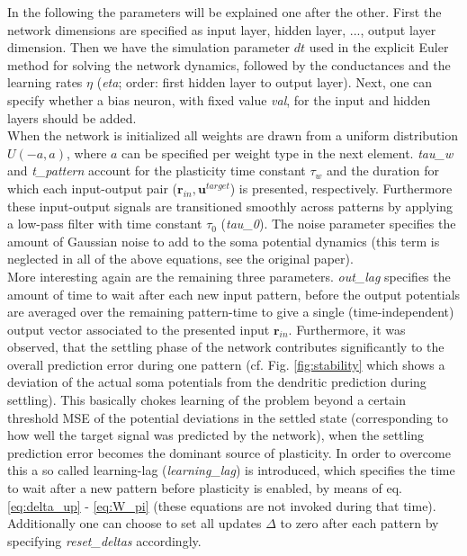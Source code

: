 \documentclass[12pt,a4paper]{article}
\begin{document}
In the following the parameters will be explained one after the other. First the network dimensions are specified as input layer, hidden layer, ..., output layer dimension. Then we have the simulation parameter $dt$ used in the explicit Euler method for solving the network dynamics, followed by the conductances and the learning rates $\eta$ (\textit{eta}; order: first hidden layer to output layer). Next, one can specify whether a bias neuron, with fixed value \textit{val}, for the input and hidden layers should be added.\\
When the network is initialized all weights are drawn from a uniform distribution $U(-a,a)$, where $a$ can be specified per weight type in the next element. \textit{tau\_w} and \textit{t\_pattern} account for the plasticity time constant $\tau_w$ and the duration for which each input-output pair ($\bm{r}_{in},\bm{u}^{target}$) is presented, respectively. Furthermore these input-output signals are transitioned smoothly across patterns by applying a low-pass filter with time constant $\tau_0$ (\textit{tau\_0}). The noise parameter specifies the amount of Gaussian noise to add to the soma potential dynamics (this term is neglected in all of the above equations, see the original paper).\\
More interesting again are the remaining three parameters. \textit{out\_lag} specifies the amount of time to wait after each new input pattern, before the output potentials are averaged over the remaining pattern-time to give a single (time-independent) output vector associated to the presented input $\bm{r}_{in}$. Furthermore, it was observed, that the settling phase of the network contributes significantly to the overall prediction error during one pattern (cf. Fig. \ref{fig:stability} which shows a deviation of the actual soma potentials from the dendritic prediction during settling). This basically chokes learning of the problem beyond a certain threshold MSE of the potential deviations in the settled state (corresponding to how well the target signal was predicted by the network), when the settling prediction error becomes the dominant source of plasticity. In order to overcome this a so called learning-lag (\textit{learning\_lag}) is introduced, which specifies the time to wait after a new pattern before plasticity is enabled, by means of eq. \eqref{eq:delta_up} - \eqref{eq:W_pi} (these equations are not invoked during that time). Additionally one can choose to set all updates $\Delta$ to zero after each pattern by specifying \textit{reset\_deltas} accordingly.\\
\end{document}
